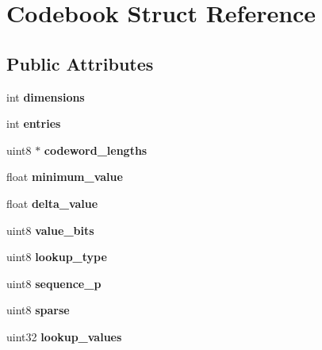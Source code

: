 \hypertarget{struct_codebook}{}\section{Codebook Struct Reference}
\label{struct_codebook}
\subsection*{Public Attributes}
\begin{DoxyCompactItemize}
\item 
\mbox{\label{struct_codebook_af2c97899a7fc32b58c0e05d2c357fbd4}} 
int {\bfseries dimensions}
\item 
\mbox{\label{struct_codebook_a3b75d1bd874ad98d552c15c547d5fc6a}} 
int {\bfseries entries}
\item 
\mbox{\label{struct_codebook_a5f692a0d4af17c8ea3b085a21b8e3ef9}} 
uint8 $\ast$ {\bfseries codeword\+\_\+lengths}
\item 
\mbox{\label{struct_codebook_a045762c79343b6153ec1978136f1feaa}} 
float {\bfseries minimum\+\_\+value}
\item 
\mbox{\label{struct_codebook_a5f68e4a9acd173f69425233d995c37ed}} 
float {\bfseries delta\+\_\+value}
\item 
\mbox{\label{struct_codebook_a229d0699f42bd26a99b37845aaab75eb}} 
uint8 {\bfseries value\+\_\+bits}
\item 
\mbox{\label{struct_codebook_addaf4509eb971e141389d6fefe3509c4}} 
uint8 {\bfseries lookup\+\_\+type}
\item 
\mbox{\label{struct_codebook_a44cedf17428b52f1df2f62a46c3af880}} 
uint8 {\bfseries sequence\+\_\+p}
\item 
\mbox{\label{struct_codebook_ab777487c6199ae81d2384f6acc113cf2}} 
uint8 {\bfseries sparse}
\item 
\mbox{\label{struct_codebook_abf078c998edfa8432087a5df96810c24}} 
uint32 {\bfseries lookup\+\_\+values}

\end{DoxyCompactItemize}
